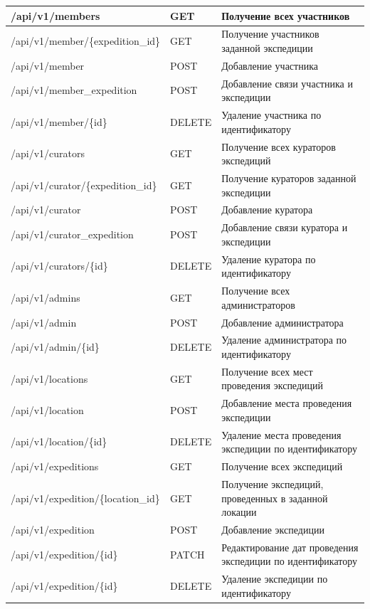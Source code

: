 \begin{landscape}
\begin{longtable}{|p{}|p{}|p{}|}
		/api/v1/members    		& GET 		& Получение всех участников  \\\hline
		/api/v1/member/\{expedition\_id\}    		& GET 		& Получение участников заданной экспедиции  \\\hline
            /api/v1/member    		& POST 		& Добавление  участника  \\\hline
            /api/v1/member\_expedition    		& POST 		& Добавление  связи участника и экспедиции  \\\hline
            /api/v1/member/\{id\}    		& DELETE 		& Удаление  участника по идентификатору  \\\hline

            /api/v1/curators    		& GET 		& Получение всех кураторов экспедиций  \\\hline
		/api/v1/curator/\{expedition\_id\}    		& GET 		& Получение кураторов заданной экспедиции  \\\hline
            /api/v1/curator    		& POST 		& Добавление  куратора  \\\hline
            /api/v1/curator\_expedition    		& POST 		& Добавление  связи куратора и экспедиции  \\\hline
            /api/v1/curators/\{id\}    		& DELETE 		& Удаление  куратора по идентификатору  \\\hline

            /api/v1/admins    		& GET 		& Получение всех администраторов \\\hline
            /api/v1/admin   		& POST 		& Добавление администратора  \\\hline
            /api/v1/admin/\{id\}    		& DELETE 		& Удаление администратора по идентификатору  \\\hline

            /api/v1/locations    		& GET 		& Получение всех мест проведения экспедиций  \\\hline
            /api/v1/location    		& POST 		& Добавление  места проведения экспедиции  \\\hline
            /api/v1/location/\{id\}    		& DELETE 		& Удаление  места проведения экспедиции по идентификатору  \\\hline

            /api/v1/expeditions    		& GET 		& Получение всех экспедиций  \\\hline
            /api/v1/expedition/\{location\_id\}    		& GET 		& Получение экспедиций, проведенных в заданной локации  \\\hline
            /api/v1/expedition    		& POST 		& Добавление экспедиции  \\\hline
            /api/v1/expedition/\{id\}    		& PATCH 		& Редактирование дат проведения экспедиции по идентификатору  \\\hline
            /api/v1/expedition/\{id\}    		& DELETE 		& Удаление  экспедиции по идентификатору  \\\hline


\end{longtable}
\end{landscape}
